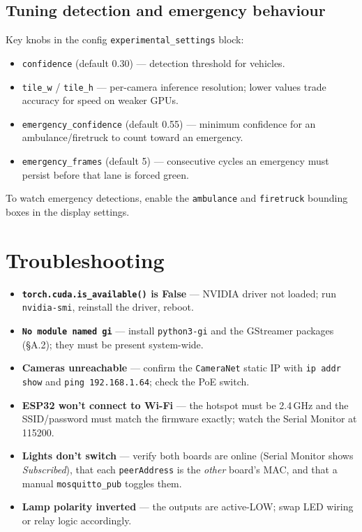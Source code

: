 \documentclass[11pt]{article}
\newcommand{\code}[1]{\texttt{#1}}
\begin{document}
\subsection{Tuning detection and emergency behaviour}
Key knobs in the config \code{experimental\_settings} block:
\begin{itemize}[nosep]
  \item \code{confidence} (default 0.30) --- detection threshold for vehicles.
  \item \code{tile\_w} / \code{tile\_h} --- per-camera inference resolution;
        lower values trade accuracy for speed on weaker GPUs.
  \item \code{emergency\_confidence} (default 0.55) --- minimum confidence for
        an ambulance/firetruck to count toward an emergency.
  \item \code{emergency\_frames} (default 5) --- consecutive cycles an emergency
        must persist before that lane is forced green.
\end{itemize}
To watch emergency detections, enable the \code{ambulance} and \code{firetruck}
bounding boxes in the display settings.

\section{Troubleshooting}
\begin{itemize}[nosep]
  \item \textbf{\code{torch.cuda.is\_available()} is False} --- NVIDIA driver
        not loaded; run \code{nvidia-smi}, reinstall the driver, reboot.
  \item \textbf{\code{No module named gi}} --- install \code{python3-gi} and the
        GStreamer packages (\S A.2); they must be present system-wide.
  \item \textbf{Cameras unreachable} --- confirm the \code{CameraNet} static IP
        with \code{ip addr show} and \code{ping 192.168.1.64}; check the PoE
        switch.
  \item \textbf{ESP32 won't connect to Wi-Fi} --- the hotspot must be 2.4\,GHz
        and the SSID/password must match the firmware exactly; watch the Serial
        Monitor at 115200.
  \item \textbf{Lights don't switch} --- verify both boards are online
        (Serial Monitor shows \emph{Subscribed}), that each \code{peerAddress}
        is the \emph{other} board's MAC, and that a manual
        \code{mosquitto\_pub} toggles them.
  \item \textbf{Lamp polarity inverted} --- the outputs are active-LOW; swap LED
        wiring or relay logic accordingly.
\end{itemize}
\end{document}

